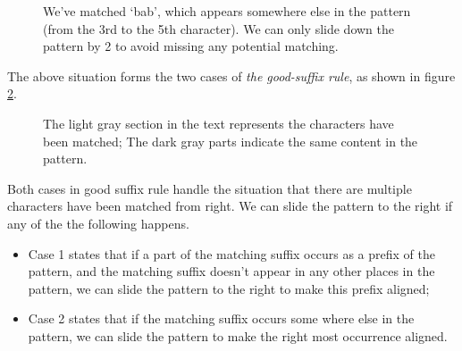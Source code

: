 \documentclass[UTF8]{article}
\begin{document}
\begin{figure}[htbp]
 \centering
 \caption{We've matched `bab', which appears somewhere else in the pattern (from the 3rd to the 5th character). We can only slide down the pattern by 2 to avoid missing any potential matching.}
 \label{fig:good-suffix-case2-1}
\end{figure}

The above situation forms the two cases of {\em the good-suffix rule}, as shown in figure \ref{fig:good-suffix-cases}.

\begin{figure}[htbp]
 \centering
  \hspace{.01\textwidth}
 \caption{The light gray section in the text represents the characters have been matched; The dark gray parts indicate the same content in the pattern.}
 \label{fig:good-suffix-cases}
\end{figure}

Both cases in good suffix rule handle the situation that there are multiple characters have
been matched from right. We can slide the pattern to the right if any of the the following
happens.

\begin{itemize}
\item Case 1 states that if a part of the matching suffix occurs as a prefix of the pattern, and
the matching suffix doesn't appear in any other places in the pattern, we can slide the pattern to the right to make this prefix aligned;
\item Case 2 states that if the matching suffix occurs some where else in the pattern, we can
slide the pattern to make the right most occurrence aligned.
\end{itemize}
\end{document}
